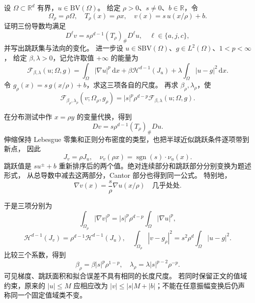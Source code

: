 \begin{exercise}\label{b1:ex:28-energy-scaling}
设 \(\Omega\subset\mathbb R^d\) 有界，\(u\in \mathrm{BV}(\Omega)\)。
给定 \(\rho>0\)、\(s\ne0\)、\(b\in\mathbb R\)，令
\[
 \Omega_\rho=\rho\Omega,\quad
 T_\rho(x)=\rho x,\quad
 v(x)=s\,u(x/\rho)+b.
\]
证明三份导数均满足
\[
 D^\ell v=s\rho^{d-1}(T_\rho)_\#D^\ell u,
 \quad \ell\in\{a,j,c\},
\]
并写出跳跃集与法向的变化。
进一步设 \(u\in \mathrm{SBV}(\Omega)\)、\(g\in L^2(\Omega)\)、\(1<p<\infty\)，
给定 \(\beta,\lambda>0\)，记允许取值 \(+\infty\) 的能量为
\[
 \mathcal F_{\beta,\lambda}(u;\Omega,g)
 =\int_\Omega|\nabla u|^p\,\mathrm dx
 +\beta\mathcal H^{d-1}(J_u)
 +\lambda\int_\Omega|u-g|^2\,\mathrm dx.
\]
令 \(g_\rho(x)=s\,g(x/\rho)+b\)，求这三项各自的尺度。
再求 \(\beta_\rho,\lambda_\rho\)，使
\[
 \mathcal F_{\beta_\rho,\lambda_\rho}(v;\Omega_\rho,g_\rho)
 =|s|^p\rho^{d-p}\mathcal F_{\beta,\lambda}(u;\Omega,g).
\]
\end{exercise}
\begin{solution}
在分布测试中作 \(x=\rho y\) 的变量代换，得到
\[
 Dv=s\rho^{d-1}(T_\rho)_\#Du.
\]
伸缩保持 Lebesgue 零集和正则分布密度的类型，也把半球近似跳跃条件逐项带到新点，
因此
\[
 J_v=\rho J_u,\quad
 \nu_v(\rho x)=\operatorname{sgn}(s)\cdot\nu_u(x).
\]
跳跃值是 \(su^\pm+b\) 重新排序后的两个值。绝对连续部分和跳跃部分分别变换为题述形式，
从总导数中减去这两部分，Cantor 部分也得到同一公式。
特别地，
\[
 \nabla v(x)=\frac{s}{\rho}\nabla u(x/\rho)
 \quad\text{几乎处处}.
\]

于是三项分别为
\[
 \int_{\Omega_\rho}|\nabla v|^p
 =|s|^p\rho^{d-p}\int_\Omega|\nabla u|^p,
\]
\[
 \mathcal H^{d-1}(J_v)=\rho^{d-1}\mathcal H^{d-1}(J_u),
 \quad
 \int_{\Omega_\rho}|v-g_\rho|^2
 =s^2\rho^d\int_\Omega|u-g|^2.
\]
比较三个系数，得到
\[
 \beta_\rho=\beta|s|^p\rho^{1-p},
 \quad
 \lambda_\rho=\lambda|s|^{p-2}\rho^{-p}.
\]
可见梯度、跳跃面积和拟合误差不具有相同的长度尺度。
若同时保留正文的值域约束，原来的 \(|u|\le M\) 应相应改为
\(|v|\le |s|M+|b|\)；不能在任意振幅变换后仍声称同一个固定值域类不变。
\end{solution}

